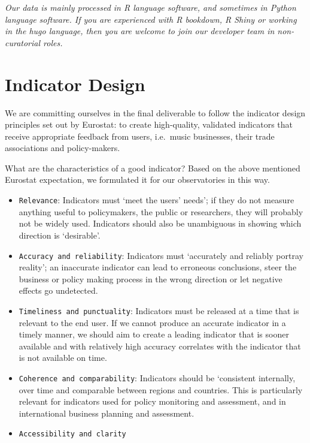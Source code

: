 \documentclass[
  a4paper,
  openany, a4paper, oneside]{book}
\providecommand{\tightlist}{%
  \setlength{\itemsep}{0pt}\setlength{\parskip}{0pt}}
\begin{document}
\emph{Our data is mainly processed in R language software, and sometimes in Python language software. If you are experienced with R bookdown, R Shiny or working in the hugo language, then you are welcome to join our developer team in non-curatorial roles.}

\hypertarget{indicator-design}{%
\section{Indicator Design}\label{indicator-design}}

We are committing ourselves in the final deliverable to follow the indicator design principles set out by Eurostat:
\citep{eurostat_harmonised_indicators_2014, kotzeva_harmonised_indicators_2017, eurostat_harmonised_indicators_2014} to create high-quality, validated indicators that receive appropriate feedback from users, i.e.~music businesses, their trade associations and policy-makers.

What are the characteristics of a good indicator? Based on the above mentioned Eurostat expectation, we formulated it for our observatories in this way.

\begin{itemize}
\tightlist
\item
  \texttt{Relevance}: Indicators must `meet the users' needs'; if they do not measure anything useful to policymakers, the public or researchers, they will probably not be widely used. Indicators should also be unambiguous in showing which direction is `desirable'.
\item
  \texttt{Accuracy\ and\ reliability}: Indicators must `accurately and reliably portray reality'; an inaccurate indicator can lead to erroneous conclusions, steer the business or policy making process in the wrong direction or let negative effects go undetected.
\item
  \texttt{Timeliness\ and\ punctuality}: Indicators must be released at a time that is relevant to the end user. If we cannot produce an accurate indicator in a timely manner, we should aim to create a leading indicator that is sooner available and with relatively high accuracy correlates with the indicator that is not available on time.
\item
  \texttt{Coherence\ and\ comparability}: Indicators should be `consistent internally, over time and comparable between regions and countries. This is particularly relevant for indicators used for policy monitoring and assessment, and in international business planning and assessment.
\item
  \texttt{Accessibility\ and\ clarity}
\end{itemize}
\end{document}
